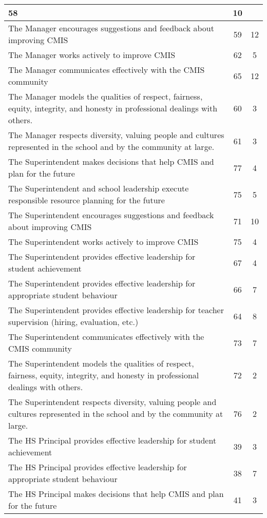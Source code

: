{\begin{tabular}{|p{2in}|c|c|}
58 &
10 \\
\hline
The Manager encourages suggestions and feedback about improving CMIS &
59 &
12 \\
\hline
The Manager works actively to improve CMIS &
62 &
5 \\
\hline
The Manager communicates effectively with the CMIS community &
65 &
12 \\
\hline
The Manager models the qualities of respect, fairness, equity, integrity, and honesty in professional dealings with others. &
60 &
3 \\
\hline
The Manager respects diversity, valuing people and cultures represented in the school and by the community at large. &
61 &
3 \\
\hline
The Superintendent makes decisions that help CMIS and plan for the future &
77 &
4 \\
\hline
The Superintendent and school leadership execute responsible resource planning for the future &
75 &
5 \\
\hline
The Superintendent encourages suggestions and feedback about improving CMIS &
71 &
10 \\
\hline
The Superintendent works actively to improve CMIS &
75 &
4 \\
\hline
The Superintendent provides effective leadership for student achievement &
67 &
4 \\
\hline
The Superintendent provides effective leadership for appropriate student behaviour &
66 &
7 \\
\hline
The Superintendent provides effective leadership for teacher supervision (hiring, evaluation, etc.) &
64 &
8 \\
\hline
The Superintendent communicates effectively with the CMIS community &
73 &
7 \\
\hline
The Superintendent models the qualities of respect, fairness, equity, integrity, and honesty in professional dealings with others. &
72 &
2 \\
\hline
The Superintendent respects diversity, valuing people and cultures represented in the school and by the community at large. &
76 &
2 \\
\hline
The HS Principal provides effective leadership for student achievement &
39 &
3 \\
\hline
The HS Principal provides effective leadership for appropriate student behaviour &
38 &
7 \\
\hline
The HS Principal makes decisions that help CMIS and plan for the future &
41 &
3 \\

\end{tabular}}
